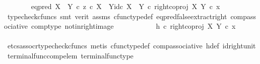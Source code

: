 \begin{isabellebody}
\ \ \ \ \ \ \isamarkupfalse%
\ {\isachardoublequoteopen}{\isacharparenleft}{\kern0pt}{\isacharparenleft}{\kern0pt}eq{\isacharunderscore}{\kern0pt}pred\ {\isacharparenleft}{\kern0pt}X\ {\isasymCoprod}\ Y{\isacharparenright}{\kern0pt}\ {\isasymcirc}\isactrlsub c\ {\isasymlangle}z\ {\isasymcirc}\isactrlsub c\ {\isasymbeta}\isactrlbsub X\ {\isasymCoprod}\ Y\isactrlesub {\isacharcomma}{\kern0pt}id\isactrlsub c\ {\isacharparenleft}{\kern0pt}X\ {\isasymCoprod}\ Y{\isacharparenright}{\kern0pt}{\isasymrangle}{\isacharparenright}{\kern0pt}\ {\isasymcirc}\isactrlsub c\ right{\isacharunderscore}{\kern0pt}coproj\ X\ Y{\isacharparenright}{\kern0pt}\ {\isasymcirc}\isactrlsub c\ x\ {\isacharequal}{\kern0pt}\ {\isasymf}{\isachardoublequoteclose}\isanewline
\ \ \ \ \ \ \ \ \isamarkupfalse%
\ {\isacharparenleft}{\kern0pt}typecheck{\isacharunderscore}{\kern0pt}cfuncs{\isacharcomma}{\kern0pt}\ smt\ {\isacharparenleft}{\kern0pt}verit{\isacharparenright}{\kern0pt}\ assms\ cfunc{\isacharunderscore}{\kern0pt}type{\isacharunderscore}{\kern0pt}def\ eq{\isacharunderscore}{\kern0pt}pred{\isacharunderscore}{\kern0pt}false{\isacharunderscore}{\kern0pt}extract{\isacharunderscore}{\kern0pt}right\ comp{\isacharunderscore}{\kern0pt}associative\ comp{\isacharunderscore}{\kern0pt}type\ not{\isacharunderscore}{\kern0pt}in{\isacharunderscore}{\kern0pt}right{\isacharunderscore}{\kern0pt}image{\isacharparenright}{\kern0pt}\isanewline
\ \ \ \ \ \ \isamarkupfalse%
\ \isamarkupfalse%
\ {\isachardoublequoteopen}{\isachardot}{\kern0pt}{\isachardot}{\kern0pt}{\isachardot}{\kern0pt}\ {\isacharequal}{\kern0pt}\ {\isacharparenleft}{\kern0pt}h\ {\isasymcirc}\isactrlsub c\ right{\isacharunderscore}{\kern0pt}coproj\ X\ Y{\isacharparenright}{\kern0pt}\ {\isasymcirc}\isactrlsub c\ x{\isachardoublequoteclose}\isanewline
\ \ \ \ \ \ \ \ \isamarkupfalse%
\ {\isacharparenleft}{\kern0pt}etcs{\isacharunderscore}{\kern0pt}assocr{\isacharcomma}{\kern0pt}typecheck{\isacharunderscore}{\kern0pt}cfuncs{\isacharcomma}{\kern0pt}\ metis\ cfunc{\isacharunderscore}{\kern0pt}type{\isacharunderscore}{\kern0pt}def\ comp{\isacharunderscore}{\kern0pt}associative\ h{\isacharunderscore}{\kern0pt}def\ id{\isacharunderscore}{\kern0pt}right{\isacharunderscore}{\kern0pt}unit{}\ terminal{\isacharunderscore}{\kern0pt}func{\isacharunderscore}{\kern0pt}comp{\isacharunderscore}{\kern0pt}elem\ terminal{\isacharunderscore}{\kern0pt}func{\isacharunderscore}{\kern0pt}type{\isacharparenright}{\kern0pt}\isanewline
\ \ \ \ \ \ \isamarkupfalse%

\end{isabellebody}
